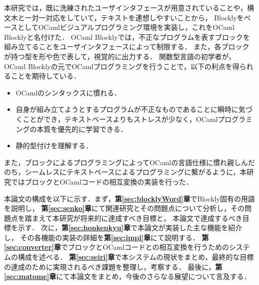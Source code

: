 本研究では，既に洗練されたユーザインタフェースが用意されていることや，構文木と一対一対応をしていて，テキストを連想しやすいことから，
BlocklyをベースとしてOCamlビジュアルプログラミング環境を実装し，これをOCaml Blocklyと名付けた．
OCaml Blocklyでは，不正なプログラムを表すブロックを組み立てることをユーザインタフェースによって制限する．
また，各ブロックが持つ型を形や色で表して，視覚的に出力する．%
関数型言語の初学者が，OCaml Blocklyの元でOCamlプログラミングを行うことで，以下の利点を得られることを期待している．
\begin{itemize}
  \item OCamlのシンタックスに慣れる．
  \item 自身が組み立てようとするプログラムが不正なものであることに瞬時に気づくことができ，テキストベースよりもストレスが少なく，OCamlプログラミングの本質を優先的に学習できる．
  \item 静的型付けを理解する．%
\end{itemize}
また，ブロックによるプログラミングによってOCamlの言語仕様に慣れ親しんだのち，シームレスにテキストベースによるプログラミングに繋がるように，本研究ではブロックとOCamlコードの相互変換の実装を行った．

本論文の構成を以下に示す．まず，{\bf 第\ref{sec:blocklyWord}章}でBlockly固有の用語を説明し，
{\bf 第\ref{sec:senko}章}にて関連研究とその問題点について分析し，その問題点を踏まえて本研究が将来的に達成すべき目標と，
本論文で達成するべき目標を示す．
次に，{\bf 第\ref{sec:honkenkyu}章}で本論文が実装した主な機能を紹介し，
その各機能の実装の詳細を{\bf 第\ref{sec:impl}章}にて説明する．
{\bf 第\ref{sec:converter}章}でブロックとOCamlコードとの相互変換を行うためのシステムの構成を述べる．
{\bf 第\ref{sec:seiri}章}で本システムの現状をまとめ，最終的な目標の達成のために実現されるべき課題を整理し，考察する．
最後に，{\bf 第\ref{sec:matome}章}にて本論文をまとめ，今後のさらなる展望について言及する．
